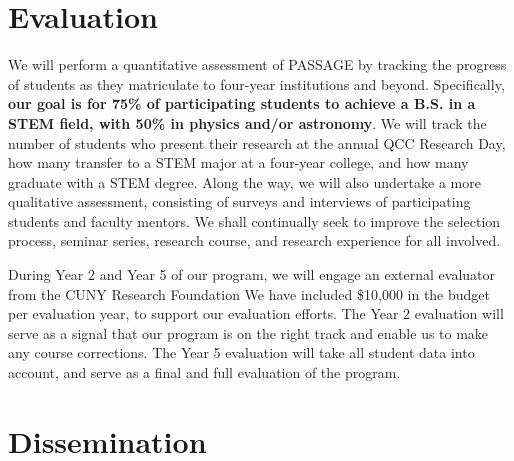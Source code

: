 \documentclass[12pt]{article}
\begin{document}
\section{Evaluation}



We will perform a quantitative assessment of PASSAGE by tracking the progress of students as they matriculate to four-year institutions and beyond. Specifically, {\bf our goal is for 75\% of participating students to achieve a B.S. in a STEM field, with 50\% in physics and/or astronomy}. We will track the number of students who present their research at the annual QCC Research Day, how many transfer to a STEM major at a four-year college, and how many graduate with a STEM degree.  Along the way, we will also undertake a more qualitative assessment, consisting of surveys and interviews of participating students and faculty mentors.  We shall continually seek to improve the selection process, seminar series, research course, and research experience for all involved.

During Year 2 and Year 5 of our program, we will engage an external evaluator from the CUNY Research Foundation  We have included \$10,000 in the budget per evaluation year, to support our evaluation efforts.  The Year 2 evaluation will serve as a signal that our program is on the right track and enable us to make any course corrections.  The Year 5 evaluation will take all student data into account, and serve as a final and full evaluation of the program.

\section{Dissemination}
\end{document}
